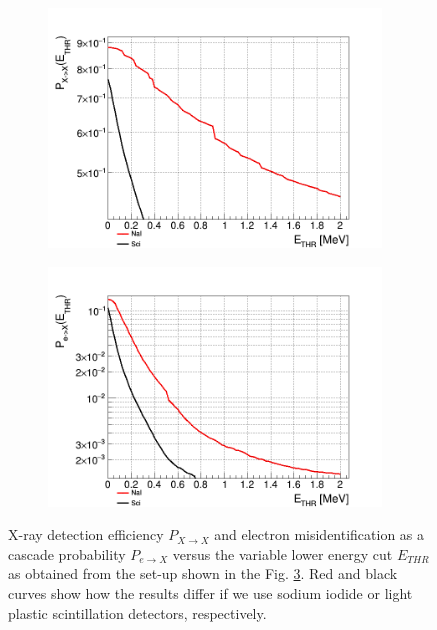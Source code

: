 \documentclass[12pt]{article}
\begin{document}
\begin{figure}[!htbp]
\begin{subfigure}{.485\textwidth}
	\centering
	\includegraphics[width=0.97\textwidth]{img/researchplan_planar_final_pxx.png}
	\label{fig:pxx}
\end{subfigure}\hspace*{4.5mm}
\begin{subfigure}{.485\textwidth}
	\centering
	\includegraphics[width=0.97\textwidth]{img/researchplan_planar_final_pex.png}
	\label{fig:pex}
\end{subfigure}	
\caption{X-ray detection efficiency $P_{X \rightarrow X}$ and electron misidentification as a cascade probability $P_{e \rightarrow X}$ versus the variable lower energy cut $E_{THR}$ as obtained from the set-up shown in the Fig. \ref{fig:planar_final}. Red and black curves show how the results differ if we use sodium iodide or light plastic scintillation detectors, respectively.}
\label{fig:planar_final}
\end{figure}
\end{document}
